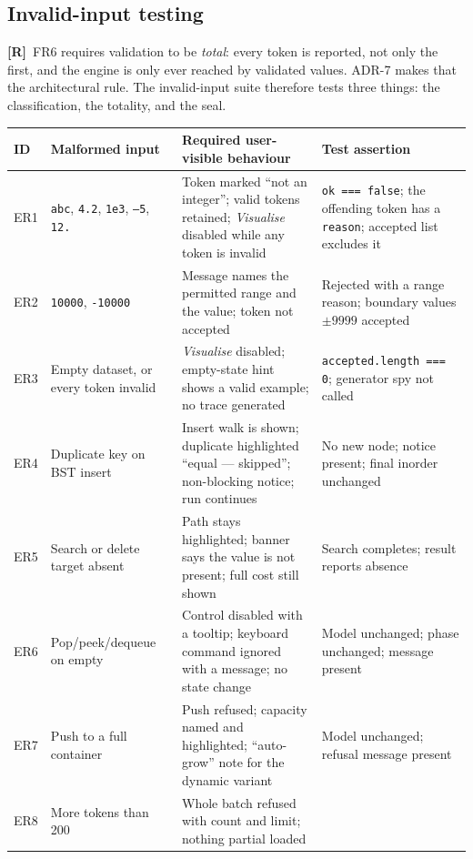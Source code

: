 \documentclass[11pt,a4paper]{article}
\newcommand{\R}{\textcolor{reqc}{\textbf{[R]}}}     %
\newcommand{\ct}[1]{\texttt{#1}}
\begin{document}
\subsection{Invalid-input testing}

\R\ FR6 requires validation to be \emph{total}: every token is reported, not only the first,
and the engine is only ever reached by validated values. ADR-7 makes that the architectural
rule. The invalid-input suite therefore tests three things: the classification, the totality,
and the seal.

\begin{table}[H]
\centering
\small
\setlength{\tabcolsep}{4pt}
\begin{tabular}{@{}L{1.2cm}L{4.4cm}L{5.4cm}L{3.2cm}@{}}
\toprule
\textbf{ID} & \textbf{Malformed input} & \textbf{Required user-visible behaviour} &
\textbf{Test assertion} \\
\midrule
ER1 & \ct{abc}, \ct{4.2}, \ct{1e3}, \ct{--5}, \ct{12.} & Token marked ``not an integer'';
valid tokens retained; \emph{Visualise} disabled while any token is invalid &
\ct{ok === false}; the offending token has a \ct{reason}; accepted list excludes it \\
ER2 & \ct{10000}, \ct{-10000} & Message names the permitted range and the value; token not
accepted & Rejected with a range reason; boundary values $\pm 9999$ accepted \\
ER3 & Empty dataset, or every token invalid & \emph{Visualise} disabled; empty-state hint
shows a valid example; no trace generated & \ct{accepted.length === 0}; generator spy not
called \\
ER4 & Duplicate key on BST insert & Insert walk is shown; duplicate highlighted ``equal ---
skipped''; non-blocking notice; run continues & No new node; notice present; final inorder
unchanged \\
ER5 & Search or delete target absent & Path stays highlighted; banner says the value is not
present; full cost still shown & Search completes; result reports absence \\
ER6 & Pop/peek/dequeue on empty & Control disabled with a tooltip; keyboard command ignored
with a message; no state change & Model unchanged; phase unchanged; message present \\
ER7 & Push to a full container & Push refused; capacity named and highlighted; ``auto-grow''
note for the dynamic variant & Model unchanged; refusal message present \\
ER8 & More tokens than 200 & Whole batch refused with count and limit; nothing partial loaded &

\end{tabular}
\end{table}
\end{document}
